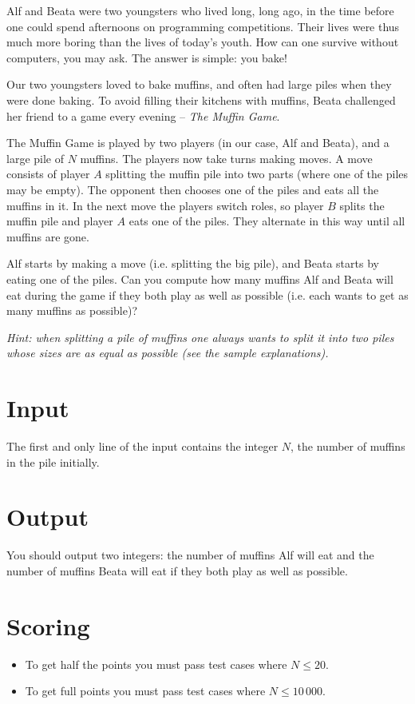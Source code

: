 
Alf and Beata were two youngsters who lived long, long ago, in the time before one could spend afternoons on programming competitions. Their lives were thus much more boring than the lives of today's youth. How can one survive without computers, you may ask. The answer is simple: you bake!

Our two youngsters loved to bake muffins, and often had large piles when they were done baking. To avoid filling their kitchens with muffins, Beata challenged her friend to a game every evening -- \emph{The Muffin Game}.

The Muffin Game is played by two players (in our case, Alf and Beata), and a large pile of $N$ muffins. The players now take turns making moves. A move consists of player $A$ splitting the muffin pile into two parts (where one of the piles may be empty). The opponent then chooses one of the piles and eats all the muffins in it. In the next move the players switch roles, so player $B$ splits the muffin pile and player $A$ eats one of the piles. They alternate in this way until all muffins are gone.

Alf starts by making a move (i.e. splitting the big pile), and Beata starts by eating one of the piles. Can you compute how many muffins Alf and Beata will eat during the game if they both play as well as possible (i.e. each wants to get as many muffins as possible)?

\emph{Hint: when splitting a pile of muffins one always wants to split it into two piles whose sizes are as equal as possible (see the sample explanations).}

\section*{Input}
The first and only line of the input contains the integer $N$, the number of muffins in the pile initially.

\section*{Output}
You should output two integers: the number of muffins Alf will eat and the number of muffins Beata will eat if they both play as well as possible.

\section*{Scoring}
\begin{itemize}
	\item To get half the points you must pass test cases where $N \le 20$.
	\item To get full points you must pass test cases where $N \le 10\,000$.
\end{itemize}


